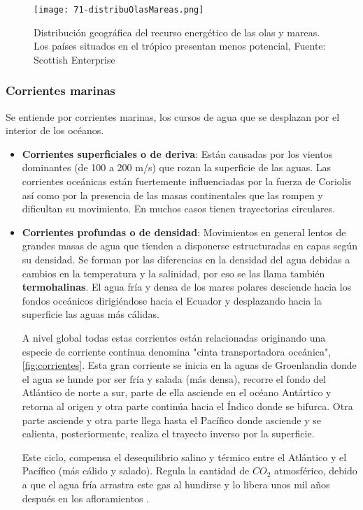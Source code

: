 \begin{figure}
\centering
\texttt{[image: 71-distribuOlasMareas.png]}
\caption[Distribución geográfica del recurso energético]{Distribución geográfica del recurso energético de las olas y mareas. Los países situados en el trópico presentan menos potencial, Fuente: Scottish Enterprise}
\label{fig:distribOlas}
\end{figure}

\subsubsection{Corrientes marinas}\label{header-n28}

Se entiende por corrientes marinas, los cursos de agua que se desplazan
por el interior de los océanos.

\begin{itemize}
\item
  \textbf{Corrientes superficiales o de deriva}: Están causadas por los
  vientos dominantes (de 100 a 200 m/s) que rozan la superficie de las
  aguas. Las corrientes oceánicas están fuertemente influenciadas por la
  fuerza de Coriolis así como por la presencia de las masas
  continentales que las rompen y dificultan su movimiento. En muchos
  casos tienen trayectorias circulares.
\item
  \textbf{Corrientes profundas o de densidad}: Movimientos en general
  lentos de grandes masas de agua que tienden a disponerse estructuradas
  en capas según su densidad. Se forman por las diferencias en la
  densidad del agua debidas a cambios en la temperatura y la salinidad,
  por eso se las llama también \textbf{termohalinas}. El agua fría y
  densa de los mares polares desciende hacia los fondos oceánicos
  dirigiéndose hacia el Ecuador y desplazando hacia la superficie las
  aguas más cálidas.

  A nivel global todas estas corrientes están relacionadas originando
  una especie de corriente continua denomina "cinta transportadora
  oceánica", \autoref{fig:corrientes}. Esta gran corriente se inicia en la aguas de Groenlandia
  donde el agua se hunde por ser fría y salada (más densa), recorre el
  fondo del Atlántico de norte a sur, parte de ella asciende en el
  océano Antártico y retorna al origen y otra parte continúa hacia el
  Índico donde se bifurca. Otra parte asciende y otra parte llega hasta
  el Pacífico donde asciende y se calienta, posteriormente, realiza el
  trayecto inverso por la superficie.

  Este ciclo, compensa el desequilibrio salino y térmico entre el
  Atlántico y el Pacífico (más cálido y salado). Regula la cantidad de
  \(CO_2\) atmosférico, debido a que el agua fría arrastra este gas al
  hundirse y lo libera unos mil años después en los afloramientos \cite{educativa}.
\end{itemize}


